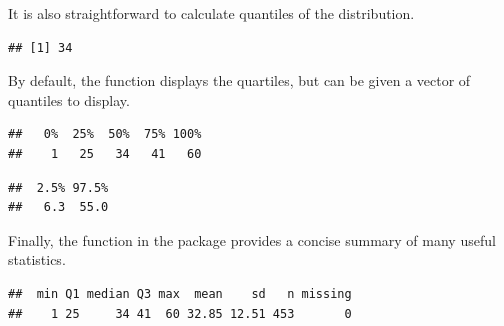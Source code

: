 It is also straightforward to calculate quantiles of the distribution.

%
%
\begin{knitrout}
\color{fgcolor}\begin{kframe}
\begin{alltt}
\hlstd{(}\hlopt{~}  
\end{alltt}
\begin{verbatim}
## [1] 34
\end{verbatim}
\end{kframe}
\end{knitrout}

By default, the  function displays the quartiles, but can be given a vector of quantiles to display.  
%
\begin{knitrout}
\color{fgcolor}\begin{kframe}
\begin{alltt}
 
\end{alltt}
\begin{verbatim}
##   0%  25%  50%  75% 100% 
##    1   25   34   41   60
\end{verbatim}
\begin{alltt}
  \hlstd{(}\hlstd{,} \hlstd{)))}
\end{alltt}
\begin{verbatim}
##  2.5% 97.5% 
##   6.3  55.0
\end{verbatim}
\end{kframe}
\end{knitrout}

\hfill

%
Finally, the  function in the  package provides a concise summary of  many useful statistics.
\begin{knitrout}
\color{fgcolor}\begin{kframe}
\begin{alltt}
\hlstd{(}\hlopt{~}  
\end{alltt}
\begin{verbatim}
##  min Q1 median Q3 max  mean    sd   n missing
##    1 25     34 41  60 32.85 12.51 453       0
\end{verbatim}
\end{kframe}
\end{knitrout}

